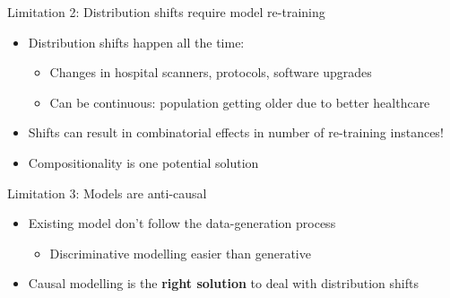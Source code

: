 \begin{frame}{Limitation 2: Distribution shifts require model re-training}


\begin{itemize}
\item Distribution shifts happen all the time:
\begin{itemize}
\item Changes in hospital scanners, protocols, software upgrades
\item Can be continuous: population getting older due to better healthcare
\end{itemize}

\vt
\item Shifts can result in combinatorial effects in number of re-training instances!

\vt

\item Compositionality is one potential solution

\end{itemize}

\begin{center}
\end{center}

\end{frame}


\begin{frame}{Limitation 3: Models are anti-causal}


\begin{itemize}
\item Existing model don't follow the data-generation process
\begin{itemize}
  \item Discriminative modelling easier than generative
\end{itemize}

\vo

 
\vo 

\item Causal modelling is the \textbf{right solution} to deal with distribution shifts

\vo

\end{itemize}


\begin{center}
\end{center}

\end{frame}


